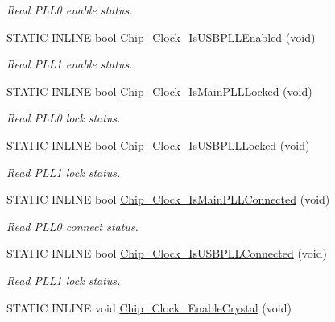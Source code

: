 \begin{DoxyCompactItemize}
\begin{DoxyCompactList}\small\item\em Read P\+L\+L0 enable status. \end{DoxyCompactList}\item 
S\+T\+A\+T\+I\+C I\+N\+L\+I\+N\+E bool \hyperlink{group___c_l_o_c_k__17_x_x__40_x_x_ga0915951815b5bd5e32b7220784a96032}{Chip\+\_\+\+Clock\+\_\+\+Is\+U\+S\+B\+P\+L\+L\+Enabled} (void)
\begin{DoxyCompactList}\small\item\em Read P\+L\+L1 enable status. \end{DoxyCompactList}\item 
S\+T\+A\+T\+I\+C I\+N\+L\+I\+N\+E bool \hyperlink{group___c_l_o_c_k__17_x_x__40_x_x_gaaa21bfa511cd25dc4f4394709dc58ced}{Chip\+\_\+\+Clock\+\_\+\+Is\+Main\+P\+L\+L\+Locked} (void)
\begin{DoxyCompactList}\small\item\em Read P\+L\+L0 lock status. \end{DoxyCompactList}\item 
S\+T\+A\+T\+I\+C I\+N\+L\+I\+N\+E bool \hyperlink{group___c_l_o_c_k__17_x_x__40_x_x_gae0a614530296b96ef560bd2986277c3e}{Chip\+\_\+\+Clock\+\_\+\+Is\+U\+S\+B\+P\+L\+L\+Locked} (void)
\begin{DoxyCompactList}\small\item\em Read P\+L\+L1 lock status. \end{DoxyCompactList}\item 
S\+T\+A\+T\+I\+C I\+N\+L\+I\+N\+E bool \hyperlink{group___c_l_o_c_k__17_x_x__40_x_x_ga4cbf783493d584cf1cf130763599a247}{Chip\+\_\+\+Clock\+\_\+\+Is\+Main\+P\+L\+L\+Connected} (void)
\begin{DoxyCompactList}\small\item\em Read P\+L\+L0 connect status. \end{DoxyCompactList}\item 
S\+T\+A\+T\+I\+C I\+N\+L\+I\+N\+E bool \hyperlink{group___c_l_o_c_k__17_x_x__40_x_x_ga7c8ad0dfc57700cefd53a0beb81955f3}{Chip\+\_\+\+Clock\+\_\+\+Is\+U\+S\+B\+P\+L\+L\+Connected} (void)
\begin{DoxyCompactList}\small\item\em Read P\+L\+L1 lock status. \end{DoxyCompactList}\item 
S\+T\+A\+T\+I\+C I\+N\+L\+I\+N\+E void \hyperlink{group___c_l_o_c_k__17_x_x__40_x_x_ga970e95c74fe056b7d846004c90a58012}{Chip\+\_\+\+Clock\+\_\+\+Enable\+Crystal} (void)

\end{DoxyCompactItemize}
